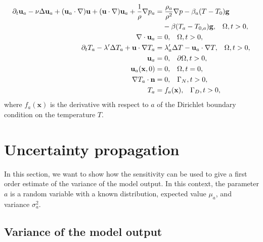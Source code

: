 \begin{subequations}
\begin{align}
\partial_t \mathbf{u}_a - \nu \Delta \mathbf{u}_a + (\mathbf{u}_a \cdot \nabla) \mathbf{u} + (\mathbf{u} \cdot \nabla) \mathbf{u}_a +\frac{1}{\rho}\nabla p_a &= \frac{\rho_a}{\rho^2}\nabla p -\beta_a(T-T_0)\mathbf{g} \nonumber \\
 &\hphantom{{} =}-\beta(T_a-T_{0,a})\mathbf{g},  \;\;\;\Omega, t > 0, \label{eq:sensitivity_1}\\
\nabla \cdot \mathbf{u}_a &= 0,  \;\;\;\Omega, t > 0, \label{eq:sensitivity_2} \\
\partial_t T_a - \lambda' \Delta T_a  + \mathbf{u} \cdot \nabla T_a &= \lambda'_a \Delta T- \mathbf{u}_a \cdot \nabla T,  \;\;\; \Omega, t > 0, \label{eq:sensitivity_3} \\
\mathbf{u}_a  &= 0, \;\;\; \partial \Omega, t > 0, \label{eq:sensitivity_4}\\
\mathbf{u}_a(\mathbf{x}, 0) &= 0, \;\;\; \Omega, t = 0,  \label{eq:sensitivity_5}\\
\nabla T_a \cdot \mathbf{n} &= 0, \;\;\;  \Gamma_N, t > 0, \label{eq:sensitivity_6}\\
T_a &= f_a(\mathbf{x}), \;\;\;  \Gamma_D, t > 0, \label{eq:sensitivity_7}
\end{align}
\end{subequations} 
where $f_a(\mathbf{x})$ is the derivative with respect to $a$ of the Dirichlet boundary condition on the temperature $T$.

\chapter{Uncertainty propagation}
\label{sec_uq}
In this section, we want to show how the sensitivity can be used to give a first order estimate of the variance of the model output. In this context, the parameter $a$ is a random variable with a known distribution, expected value $\mu_a$, and variance $\sigma_a^2$. 

\section{Variance of the model output}

